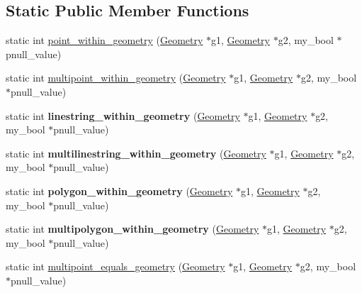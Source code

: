 \subsection*{Static Public Member Functions}
\begin{DoxyCompactItemize}
\item 
static int \mbox{\hyperlink{classBG__wrap_a58dc9aa949ea613f634d6078968c007c}{point\+\_\+within\+\_\+geometry}} (\mbox{\hyperlink{classGeometry}{Geometry}} $\ast$g1, \mbox{\hyperlink{classGeometry}{Geometry}} $\ast$g2, my\+\_\+bool $\ast$pnull\+\_\+value)
\item 
static int \mbox{\hyperlink{classBG__wrap_ae4c4fd684893083dd4a3a1a549825bbf}{multipoint\+\_\+within\+\_\+geometry}} (\mbox{\hyperlink{classGeometry}{Geometry}} $\ast$g1, \mbox{\hyperlink{classGeometry}{Geometry}} $\ast$g2, my\+\_\+bool $\ast$pnull\+\_\+value)
\item 
\mbox{\label{classBG__wrap_abc1b92939ce92d33caf3141ce4cd65be}} 
static int {\bfseries linestring\+\_\+within\+\_\+geometry} (\mbox{\hyperlink{classGeometry}{Geometry}} $\ast$g1, \mbox{\hyperlink{classGeometry}{Geometry}} $\ast$g2, my\+\_\+bool $\ast$pnull\+\_\+value)
\item 
\mbox{\label{classBG__wrap_aefc3fa5ef42c2ca98e0848db25674dec}} 
static int {\bfseries multilinestring\+\_\+within\+\_\+geometry} (\mbox{\hyperlink{classGeometry}{Geometry}} $\ast$g1, \mbox{\hyperlink{classGeometry}{Geometry}} $\ast$g2, my\+\_\+bool $\ast$pnull\+\_\+value)
\item 
\mbox{\label{classBG__wrap_ac17d3aca6eca54cdae007fe31c99e403}} 
static int {\bfseries polygon\+\_\+within\+\_\+geometry} (\mbox{\hyperlink{classGeometry}{Geometry}} $\ast$g1, \mbox{\hyperlink{classGeometry}{Geometry}} $\ast$g2, my\+\_\+bool $\ast$pnull\+\_\+value)
\item 
\mbox{\label{classBG__wrap_a1d5ca222fca81be02252a926d9825fc8}} 
static int {\bfseries multipolygon\+\_\+within\+\_\+geometry} (\mbox{\hyperlink{classGeometry}{Geometry}} $\ast$g1, \mbox{\hyperlink{classGeometry}{Geometry}} $\ast$g2, my\+\_\+bool $\ast$pnull\+\_\+value)
\item 
static int \mbox{\hyperlink{classBG__wrap_aa0cc7de2add1a74de006133f05305ecb}{multipoint\+\_\+equals\+\_\+geometry}} (\mbox{\hyperlink{classGeometry}{Geometry}} $\ast$g1, \mbox{\hyperlink{classGeometry}{Geometry}} $\ast$g2, my\+\_\+bool $\ast$pnull\+\_\+value)

\end{DoxyCompactItemize}
